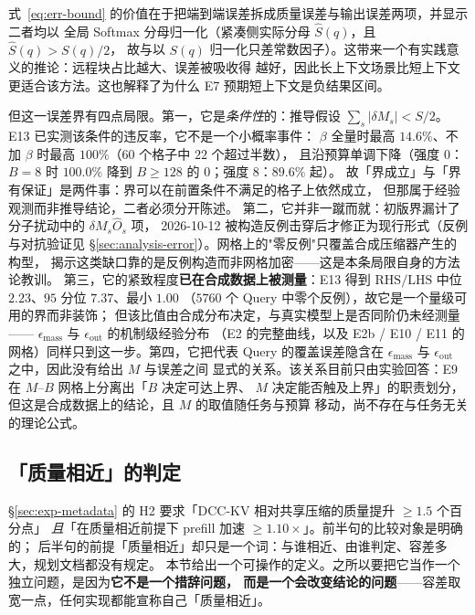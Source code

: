 式~\eqref{eq:err-bound} 的价值在于把端到端误差拆成质量误差与输出误差两项，并显示二者均以
全局 Softmax 分母归一化（紧凑侧实际分母 $\widehat{S}(q)$，且 $\widehat{S}(q)>S(q)/2$，
故与以 $S(q)$ 归一化只差常数因子）。这带来一个有实践意义的推论：远程块占比越大、误差被吸收得
越好，因此长上下文场景比短上下文更适合该方法。这也解释了为什么 E7 预期短上下文是负结果区间。

但这一误差界有四点局限。第一，它是\emph{条件性}的：推导假设
$\sum_s |\delta M_s| < S/2$。E13 已实测该条件的违反率，它不是一个小概率事件：
$\beta$ 全量时最高 $14.6\%$、不加 $\beta$ 时最高 $100\%$（$60$ 个格子中 $22$ 个超过半数），
且沿预算单调下降（强度 $0$：$B=8$ 时 $100.0\%$ 降到 $B\ge128$ 的 $0$；强度 $8$：$89.6\%$ 起）。
故「界成立」与「界有保证」是两件事：界可以在前置条件不满足的格子上依然成立，
但那属于经验观测而非推导结论，二者必须分开陈述。
第二，它并非一蹴而就：初版界漏计了分子扰动中的 $\delta M_s\widehat{O}_s$ 项，
2026-10-12 被构造反例击穿后才修正为现行形式（反例与对抗验证见
\S\ref{sec:analysis-error}）。网格上的"零反例"只覆盖合成压缩器产生的构型，
揭示这类缺口靠的是反例构造而非网格加密——这是本条局限自身的方法论教训。
第三，它的紧致程度\textbf{已在合成数据上被测量}：E13 得到
$\mathrm{RHS}/\mathrm{LHS}$ 中位 $2.23$、$95$ 分位 $7.37$、最小 $1.00$
（$5760$ 个 Query 中零个反例），故它是一个量级可用的界而非装饰；
但该比值由合成分布决定，与真实模型上是否同阶仍未经测量——
$\epsilon_{\text{mass}}$ 与 $\epsilon_{\text{out}}$ 的机制级经验分布
（E2 的完整曲线，以及 E2b / E10 / E11 的网格）同样只到这一步。第四，它把代表 Query 的覆盖误差隐含在
$\epsilon_{\text{mass}}$ 与 $\epsilon_{\text{out}}$ 之中，因此没有给出 $M$ 与误差之间
显式的关系。该关系目前只由实验回答：E9 在 $M$--$B$ 网格上分离出「$B$ 决定可达上界、
$M$ 决定能否触及上界」的职责划分，但这是合成数据上的结论，且 $M$ 的取值随任务与预算
移动，尚不存在与任务无关的理论公式。

\subsection{「质量相近」的判定}
\label{sec:quality-comparable}

\S\ref{sec:exp-metadata} 的 H2 要求「DCC-KV 相对共享压缩的质量提升 $\ge 1.5$ 个百分点」
\emph{且}「在质量相近前提下 prefill 加速 $\ge 1.10\times$」。前半句的比较对象是明确的；
后半句的前提「质量相近」却只是一个词：与谁相近、由谁判定、容差多大，规划文档都没有规定。
本节给出一个可操作的定义。之所以要把它当作一个独立问题，是因为\textbf{它不是一个措辞问题，
而是一个会改变结论的问题}——容差取宽一点，任何实现都能宣称自己「质量相近」。

